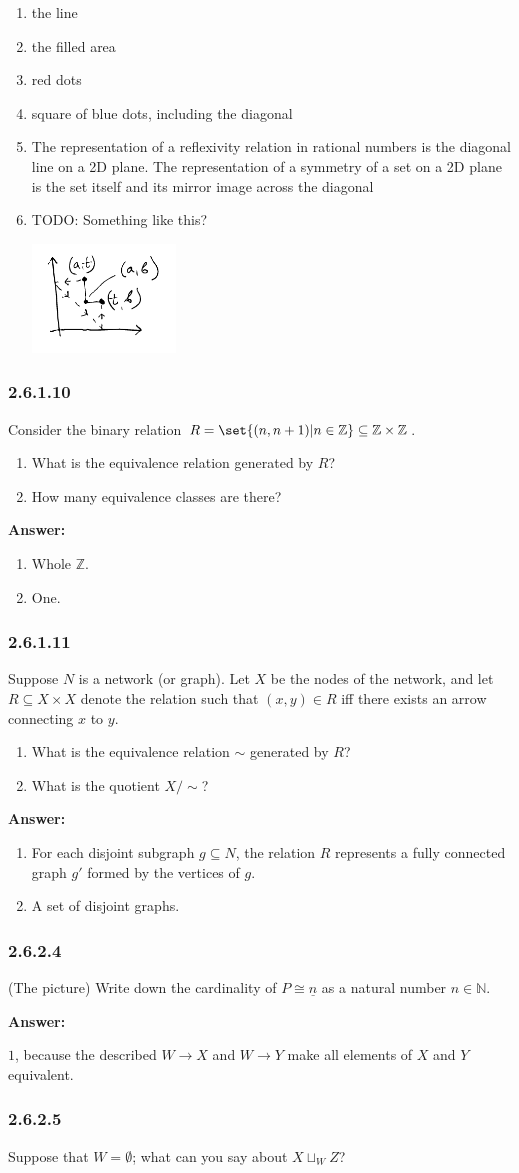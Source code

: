 \documentclass{article}
\newcommand{\N}{\mathbb{N}}
\newcommand{\Z}{\mathbb{Z}}
\newcommand{\vsp}[0]{\vspace*{10pt}\par}
\newcommand{\exercise}[1]{\subsubsection*{#1}}
\newcommand{\ans}[0]{\vsp\textbf{Answer: }\vsp}
\newcommand{\ei}{\item}
\newcommand{\es}{\begin{enumerate}[label=(\alph*)]\ei}
\newcommand{\ee}{\end{enumerate}}
\begin{document}
\es the line
\ei the filled area
\ei red dots
\ei square of blue dots, including the diagonal
\ei The representation of a reflexivity relation in rational numbers is the diagonal line on a 2D
    plane. The representation of a symmetry of a set on a 2D plane is the set itself and its mirror
    image across the diagonal
\ei TODO: Something like this?
    \begin{center}
    \includegraphics[width=0.3\textwidth]{img/heuristic.png}
    \end{center}
\ee

\exercise{2.6.1.10}

Consider the binary relation $R = \set{(n,n+1)|n\in\Z}\subseteq\Z\times\Z$.

\es What is the equivalence relation generated by $R$?
\ei How many equivalence classes are there?
\ee

\ans

\es Whole $\Z$.
\ei One.
\ee

\exercise{2.6.1.11}

Suppose $N$ is a network (or graph). Let $X$ be the nodes of the network, and
let $R \subseteq X \times X$ denote the relation such that $(x, y) \in R$ iff
there exists an arrow connecting $x$ to $y$.

\es What is the equivalence relation $\sim$ generated by $R$?
\ei What is the quotient $X/\sim$?
\ee

\ans

\es For each disjoint subgraph $g \subseteq N$, the relation $R$ represents a
    fully connected graph $g'$ formed by the vertices of $g$.
\ei A set of disjoint graphs.
\ee

\exercise{2.6.2.4}

(The picture) Write down the cardinality of $P \cong \underline{n}$ as a natural
number $n \in \N$.

\ans

$1$, because the described $W \to X$ and $W \to Y$ make all elements of $X$ and
$Y$ equivalent.

\exercise{2.6.2.5}

Suppose that $W = \emptyset$; what can you say about $X \sqcup_W Z$?
\end{document}
